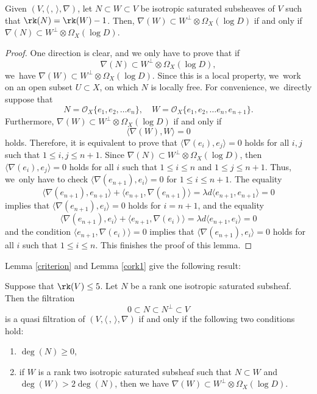 \begin{lem}\label{cork1}
Given $(V,\langle \,, \, \rangle,\nabla)$, let $N \subset W \subset V$ be isotropic saturated subsheaves of $V$ such that $\rk(N)=\rk(W)-1$. Then, $\nabla(W)\subset W^\perp\otimes \Omega_X(\log D)$ if and only if $\nabla(N)\subset W^\perp\otimes \Omega_X(\log D)$.
\end{lem}
\begin{proof}
One direction is clear, and we only have to prove that if
\[
\nabla(N)\subset W^\perp\otimes \Omega_X(\log D),
\]
we~have $\nabla(W)\subset W^\perp\otimes \Omega_X(\log D)$. Since this is a local property, we~work on an open subset $U \subset X$, on which $N$ is locally free. For convenience, we~directly suppose that
\[
N=\mathcal{O}_X\{e_1, e_2,\dots e_n\},\quad W=\mathcal{O}_X\{e_1, e_2,\dots e_n, e_{n+1}\}.
\]
Furthermore, $\nabla(W)\subset W^\perp\otimes \Omega_X(\log D)$ if and only if
\[
\langle \nabla(W),W \rangle=0
\]
holds. Therefore, it is equivalent to prove that $\langle \nabla(e_i), e_j \rangle=0$ holds for all $i,j$ such that $1\leq i,j\leq n+1$. Since $\nabla(N)\subset W^\perp\otimes \Omega_X(\log D)$, then $\langle \nabla(e_i), e_j \rangle=0$ holds for all $i$ such that $1\leq i\leq n$ and $1\leq j\leq n+1$. Thus, we~only have to check $\langle \nabla(e_{n+1}), e_i \rangle=0$ for $1\leq i\leq n+1$. The equality
\[
\langle \nabla(e_{n+1}), e_{n+1} \rangle+\langle e_{n+1}, \nabla(e_{n+1}) \rangle=\lambda d\langle e_{n+1},e_{n+1} \rangle=0
\]
implies that $\langle \nabla(e_{n+1}), e_i \rangle=0$ holds for $i= n+1$, and the equality
\[
\langle \nabla(e_{n+1}), e_i \rangle+\langle e_{n+1}, \nabla(e_i) \rangle=\lambda d\langle e_{n+1},e_i \rangle=0
\]
and the condition $\langle e_{n+1}, \nabla(e_i) \rangle=0$ implies that $\langle \nabla(e_{n+1}), e_i \rangle=0$ holds for all $i$ such that $1\leq i\leq n$. This finishes the proof of this lemma.
\end{proof}

Lemma \ref{criterion} and Lemma \ref{cork1} give the following result:
\begin{lem}\label{criterionrk5}
Suppose that $\rk(V) \leq 5$. Let $N$ be a rank one isotropic saturated subsheaf. Then the filtration
\[
0\subset N\subset N^\perp\subset V
\]
is a quasi \grsemistable filtration of $(V, \langle \,, \, \rangle, \nabla)$ if and only if the following two conditions hold:
\begin{enumerate}
\item $\deg(N)\geq 0$,

\item if $W$ is a rank two isotropic saturated subsheaf such that $N \subset W$ and $\deg(W)>2\deg(N)$, then we have $\nabla(W)\subset W^\perp\otimes \Omega_X(\log D)$.
\end{enumerate}
\end{lem}

